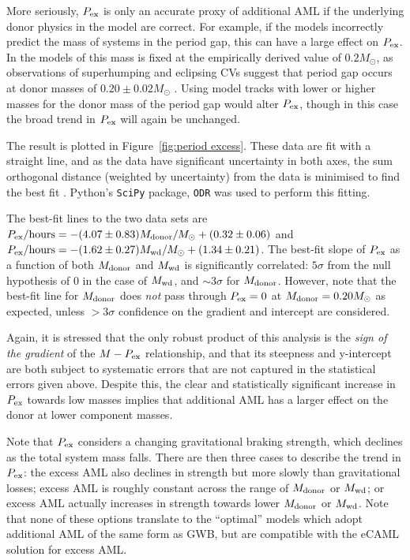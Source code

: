 More seriously, $P_{\rm ex}$ is only an accurate proxy of additional AML if the underlying donor physics in the model are correct. For example, if the models incorrectly predict the mass of systems in the period gap, this can have a large effect on $P_{\rm ex}$. In the models of \citet{knigge11} this mass is fixed at the empirically derived value of $0.2 M_\odot$, as observations of superhumping and eclipsing CVs suggest that period gap occurs at donor masses of $0.20 \pm 0.02 M_\odot$ \citep{knigge2006}. Using model tracks with lower or higher masses for the donor mass of the period gap would alter $P_{\rm ex}$, though in this case the broad trend in $P_{\rm ex}$ will again be unchanged.

The result is plotted in Figure~\ref{fig:period excess}. These data are fit with a straight line, and as the data have significant uncertainty in both axes, the sum orthogonal distance (weighted by uncertainty) from the data is minimised to find the best fit \citep{hogg2010}. Python's \lstinline{SciPy} package, \lstinline{ODR} was used to perform this fitting.

 The best-fit lines to the two data sets are $P_{\rm ex} / \mathrm{hours} = -(4.07\pm0.83) M_{\rm donor}/M_\odot + (0.32\pm0.06)$ and $P_{\rm ex} / \mathrm{hours} = -(1.62\pm0.27) M_{\rm wd}/M_\odot + (1.34\pm0.21)$.
The best-fit slope of $P_{\rm ex}$ as a function of both $M_{\rm donor}$ and $M_{\rm wd}$ is significantly correlated: $5\sigma$ from the null hypothesis of 0 in the case of $M_{\rm wd}$, and $\sim 3\sigma$ for $M_{\rm donor}$.
 However, note that the best-fit line for $M_{\rm donor}$ does \textit{not} pass through $P_{\rm ex} = 0$ at $M_{\rm donor} = 0.20 M_\odot$ as expected, unless $>3\sigma$ confidence on the gradient and intercept are considered.

Again, it is stressed that the only robust product of this analysis is the \textit{sign of the gradient} of the $M - P_{\rm ex}$ relationship, and that its steepness and y-intercept are both subject to systematic errors that are not captured in the statistical errors given above. Despite this, the clear and statistically significant increase in $P_{\rm ex}$ towards low masses implies that additional AML has a larger effect on the donor at lower component masses.

Note that $P_{\rm ex}$ considers a changing gravitational braking strength, which declines as the total system mass falls.
There are then three cases to describe the trend in $P_{\rm ex}$: the excess AML also declines in strength but more slowly than gravitational losses; excess AML is roughly constant across the range of $M_{\rm donor}$ or $M_{\rm wd}$; or excess AML actually increases in strength towards lower $M_{\rm donor}$ or $M_{\rm wd}$. Note that none of these options translate to the ``optimal'' \citet{knigge11} models which adopt additional AML of the same form as GWB, but are compatible with the eCAML solution for excess AML.


